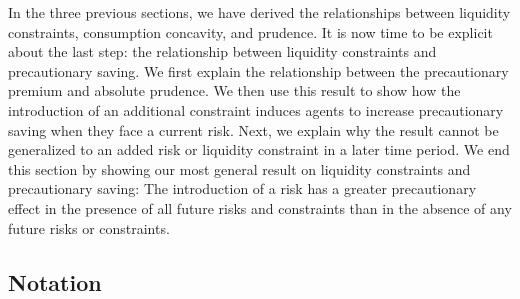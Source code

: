 In the three previous sections, we have derived the relationships between liquidity constraints, consumption concavity, and prudence. It is now time to be explicit about the last step: the relationship between liquidity constraints and precautionary saving. We first explain the relationship between the precautionary premium and absolute prudence. We then use this result to show how the introduction of an additional constraint induces agents to increase precautionary saving when they face a current risk. Next, we explain why the result cannot be generalized to an added risk or liquidity constraint in a later time period. We end this section by showing our most general result on liquidity constraints and precautionary saving: The introduction of a risk has a greater precautionary effect in the presence of all future risks and constraints than in the absence of any future risks or constraints.

\subsection{Notation}\label{subsec:PrudAndCPP}

